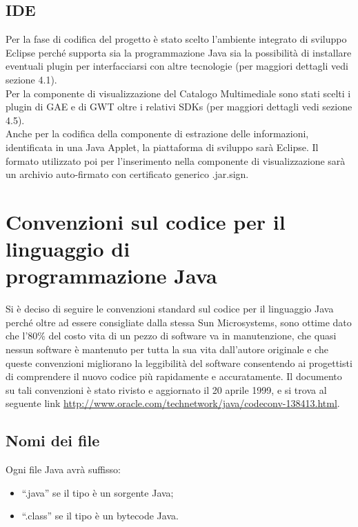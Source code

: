 \subsection{IDE}
Per la fase di codifica del progetto \`e stato scelto l'ambiente
integrato di sviluppo Eclipse perch\'e supporta sia la programmazione Java
sia la possibilit\`a  di installare eventuali plugin per interfacciarsi con
altre tecnologie (per maggiori dettagli vedi sezione 4.1).\\
Per la componente di visualizzazione del Catalogo
Multimediale sono stati scelti i plugin di GAE e di GWT oltre i relativi SDKs
(per maggiori dettagli vedi sezione 4.5).\\ 
Anche per la codifica della componente di estrazione delle informazioni,
identificata in una Java Applet, la piattaforma di sviluppo sar\`a Eclipse. Il
formato utilizzato poi per l'inserimento nella componente di visualizzazione
sar\`a un archivio auto-firmato con certificato generico .jar.sign.


\section{Convenzioni sul codice per il linguaggio di \\programmazione Java}
Si \`e deciso di seguire le convenzioni standard sul codice per il linguaggio
Java perch\'e oltre ad essere consigliate dalla stessa Sun Microsystems, sono
ottime dato che l'80\% del costo vita di un pezzo di software va in
manutenzione, che quasi nessun software \`e mantenuto per tutta la sua vita
dall'autore originale e che queste convenzioni migliorano la leggibilit\`a
del software consentendo ai progettisti di comprendere il nuovo codice pi\`u
rapidamente e accuratamente.
Il documento su tali convenzioni \`e stato rivisto e aggiornato il 20 aprile
1999, e si trova al seguente link
\url{http://www.oracle.com/technetwork/java/codeconv-138413.html}.

\subsection{Nomi dei file}
Ogni file Java avr\`a suffisso:
\begin{itemize}
  \item ``.java'' se il tipo \`e un sorgente Java;
  \item ``.class'' se il tipo \`e un bytecode Java.
\end{itemize}

